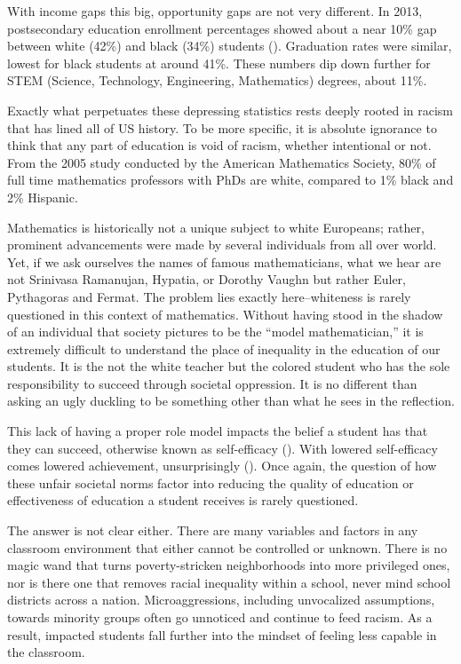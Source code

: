 With income gaps this big, opportunity gaps are not very different. In 2013, postsecondary education enrollment percentages showed about a near 10\% gap between white (42\%) and black (34\%) students (\cite{musu-gillette_status_nodate}). Graduation rates were similar, lowest for black students at around 41\%. These numbers dip down further for STEM (Science, Technology, Engineering, Mathematics) degrees, about 11\%.

Exactly what perpetuates these depressing statistics rests deeply rooted in racism that has lined all of US history. To be more specific, it is absolute ignorance to think that any part of education is void of racism, whether intentional or not. From the 2005 study conducted by the American Mathematics Society, 80\% of full time mathematics professors with PhDs are white, compared to 1\% black and 2\% Hispanic.

Mathematics is historically not a unique subject to white Europeans; rather, prominent advancements were made by several individuals from all over world. Yet, if we ask ourselves the names of famous mathematicians, what we hear are not Srinivasa Ramanujan, Hypatia, or Dorothy Vaughn but rather Euler, Pythagoras and Fermat. The problem lies exactly here--whiteness is rarely questioned in this context of mathematics. Without having stood in the shadow of an individual that society pictures to be the ``model mathematician,'' it is extremely difficult to understand the place of inequality in the education of our students. It is the not the white teacher but the colored student who has the sole responsibility to succeed through societal oppression. It is no different than asking an ugly duckling to be something other than what he sees in the reflection.

This lack of having a proper role model impacts the belief a student has that they can succeed, otherwise known as self-efficacy (\cite{thevenin_mentors_2007}). With lowered self-efficacy comes lowered achievement, unsurprisingly (\cite{motlagh_relationship_2011}). Once again, the question of how these unfair societal norms factor into reducing the quality of education or effectiveness of education a student receives is rarely questioned.

The answer is not clear either. There are many variables and factors in any classroom environment that either cannot be controlled or unknown. There is no magic wand that turns poverty-stricken neighborhoods into more privileged ones, nor is there one that removes racial inequality within a school, never mind school districts across a nation. Microaggressions, including unvocalized assumptions, towards minority groups often go unnoticed and continue to feed racism. As a result, impacted students fall further into the mindset of feeling less capable in the classroom.


